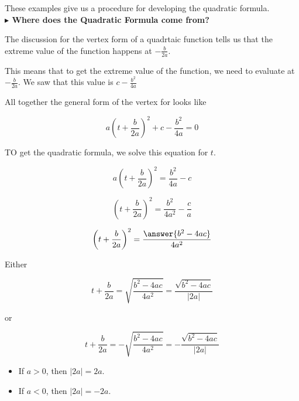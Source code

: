 \documentclass{ximera}
\begin{document}
These examples give us a procedure for developing the quadratic formula. \\




















\textbf{\textcolor{purple!85!blue}{$\blacktriangleright$ Where does the Quadratic Formula come from?}} 


The discussion for the vertex form of a quadrtaic function tells us that the extreme value of the function happens at $-\frac{b}{2a}$.

This means that to get the extreme value of the function, we need to evaluate at $-\frac{b}{2a}$. We saw that this value is $c - \frac{b^2}{4a}$


All together the general form of the vertex for looks like














\[ a\left(t + \frac{b}{2 a}\right)^2 + c - \frac{b^2}{4 a}  = 0\]

TO get the quadratic formula, we solve this equation for $t$.



\begin{explanation}
\[ a \left(t + \frac{b}{2 a} \right)^2  = \frac{b^2}{4 a} - c\]

\[ \left(t + \frac{b}{2 a} \right)^2  = \frac{b^2}{4 a^2} - \frac{c}{a}\]

\[ \left(t + \frac{b}{2 a} \right)^2  = \frac{\answer{b^2 - 4 a c}}{4 a^2} \]
\end{explanation}


Either 


\[ t + \frac{b}{2 a}  = \sqrt{\frac{b^2 - 4 a c}{4 a^2}}  = \frac{\sqrt{b^2 - 4 a c}}{| 2a |}   \]

or


\[ t + \frac{b}{2 a}  = -\sqrt{\frac{b^2 - 4 a c}{4 a^2}} = -\frac{\sqrt{b^2 - 4 a c}}{| 2a |}    \]



\begin{itemize}
\item If $a > 0$, then $| 2a | = 2a$.
\item If $a < 0$, then $| 2a | = -2a$.
\end{itemize}
\end{document}
